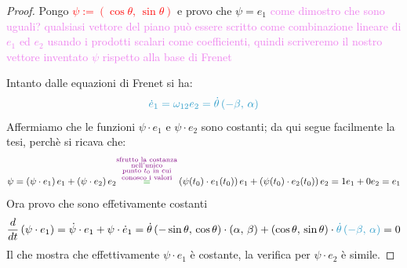 \begin{proof}
        Pongo \textcolor{red}{$\psi := \left(\cos \theta, \, \sin \theta \right)$} e provo che $\psi = e_1$
        \textcolor{violet}{come dimostro che sono uguali? qualsiasi vettore del piano può essere scritto come combinazione lineare di $e_1$ ed $e_2$ usando i prodotti scalari come coefficienti,
        quindi scriveremo il nostro vettore inventato $\psi$ rispetto alla base di Frenet}

        Intanto dalle equazioni di Frenet si ha:
        \[ \color{celeste} \dot{e}_1 = \omega_{12} e_2 = \dot{\theta} \left(- \beta, \, \alpha \right) \]
        Affermiamo che le funzioni $ \psi \cdot e_1$ e $\psi \cdot e_2$ sono costanti; da qui segue facilmente la tesi, perchè si ricava che:
        \[ \psi = \left( \psi \cdot e_1 \right) e_1 + \left( \psi \cdot e_2 \right) e_2 \overset{\color{violet} \substack{\text{sfrutto la costanza} \\ \text{nell'unico} \\ \text{punto  } t_0 \text{ in cui} \\ \text{conosco i valori}}}{\textcolor{verde}{=}} \left( \psi(t_0) \cdot e_1(t_0) \right) e_1 + \left( \psi(t_0) \cdot e_2(t_0) \right) e_2 = 1 e_1 + 0 e_2 = e_1 \]
        Ora provo che sono effetivamente costanti 
        \[ \frac{d}{dt} \left( \psi \cdot e_1\right) = \dot{\psi} \cdot e_1 + \psi \cdot \dot{e}_1 = \dot{\theta} \left(- \sin \theta, \, \cos \theta \right) \cdot \left( \alpha, \, \beta \right) + \left(\cos \theta, \, \sin \theta \right) \cdot \textcolor{celeste}{\dot{\theta}  \left( -\beta, \, \alpha \right)} = 0 \]
        Il che mostra che effettivamente $\psi \cdot e_1$ è costante, la verifica per $\psi \cdot e_2$ è simile.
        \end{proof}
